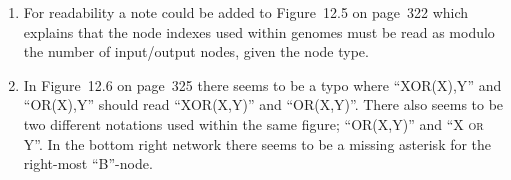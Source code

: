 \begin{enumerate}
\item For readability a note could be added to Figure~12.5 on page~322 which explains that the node indexes used within genomes must be read as modulo the number of input/output nodes, given the node type.

\item In Figure~12.6 on page~325 there seems to be a typo where ``\textsc{XOR(X),Y}'' and ``\textsc{OR(X),Y}'' should read ``\textsc{XOR(X,Y)}'' and ``\textsc{OR(X,Y)}''. There also seems to be two different notations used within the same figure; ``\textsc{OR(X,Y)}'' and ``\textsc{X or Y}''. In the bottom right network there seems to be a missing asterisk for the right-most ``B''-node.
\end{enumerate}



